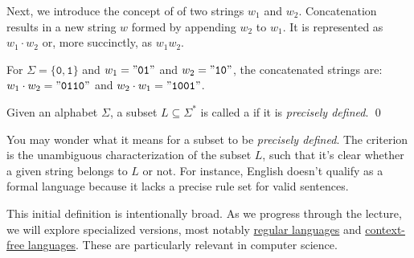 Next, we introduce the concept of   of two strings \( w_1 \) and
\(w_2 \). Concatenation results in a new string \( w \) formed by appending \( w_2 \) to \( w_1 \). It is
represented as \( w_1 \cdot w_2 \) or, more succinctly, as \( w_1w_2 \). 

\vspace*{0.3cm}

\exampleEng
For \( \Sigma = \{\mathtt{0}, \mathtt{1}\} \) and \( w_1 = \mathtt{"01"} \) and \( w_2 = \mathtt{"10"} \), the concatenated strings are:
\\[0.2cm]
\hspace*{1.3cm}
\( w_1 \cdot w_2 = \mathtt{"0110"} \) and \( w_2 \cdot w_1 = \mathtt{"1001"} \). \eox

\begin{Definition} \hspace*{\fill} \linebreak
Given an alphabet \( \Sigma \), a subset \( L \subseteq \Sigma^* \) is called a  if it is \emph{precisely defined}.  \qed
\end{Definition}

You may wonder what it means for a subset to be \emph{precisely defined}. The criterion is the unambiguous characterization of the subset \( L \), such that it's clear whether a given string belongs to \( L \) or not. For instance, English doesn't qualify as a formal language because it lacks a precise rule set for valid sentences.

This initial definition is intentionally broad. As we progress through the lecture, we will explore specialized versions, most notably \href{http://en.wikipedia.org/wiki/Regular_language}{regular languages}  and \href{http://en.wikipedia.org/wiki/Context-free_language}{context-free languages}.  These are particularly relevant in computer science.

